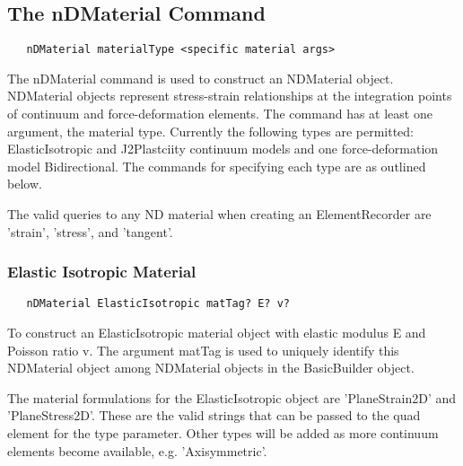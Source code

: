 \documentclass[12pt]{article}
\begin{document}


\subsection{The nDMaterial Command}
{\sf\small
\begin{verbatim}
   nDMaterial materialType <specific material args>
\end{verbatim}
}

The nDMaterial command is used to construct an NDMaterial object. NDMaterial
objects represent stress-strain relationships at the integration points of
continuum and force-deformation elements. The command has at least one
argument, the material type. Currently the following types are
permitted: ElasticIsotropic and J2Plastciity continuum models and one
force-deformation model Bidirectional. The commands for specifying
each type are as outlined below.  

The valid queries to any ND material when creating an ElementRecorder
are 'strain', 'stress', and 'tangent'.

\subsubsection{Elastic Isotropic Material}
{\sf\small
\begin{verbatim}
   nDMaterial ElasticIsotropic matTag? E? v?
\end{verbatim}
}

To construct an ElasticIsotropic material object with elastic modulus
E and Poisson ratio v. The argument matTag is used to
uniquely identify this NDMaterial object among NDMaterial objects
in the BasicBuilder object.

The material formulations for the ElasticIsotropic object are 'PlaneStrain2D' and
'PlaneStress2D'. These are the valid strings that can be passed to the quad
element for the type parameter. Other types will be added as more
continuum elements become available, e.g. 'Axisymmetric'.
\end{document}
